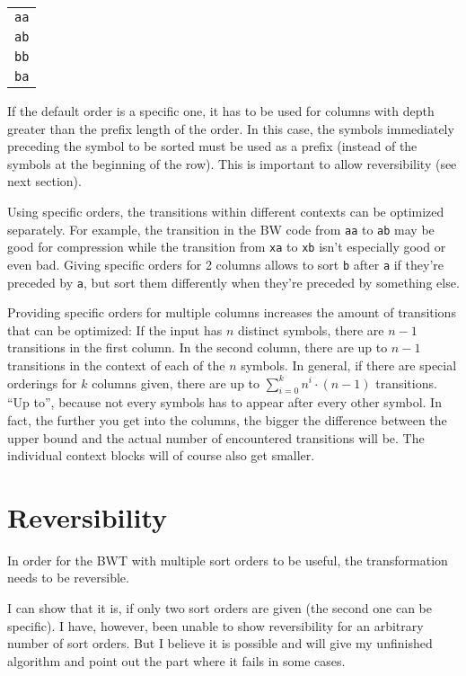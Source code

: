 \documentclass[a4paper]{scrreprt}
\begin{document}
\begin{tabular}{c}
\texttt{aa} \\
\texttt{ab} \\
\texttt{bb} \\ 
\texttt{ba} \\
\end{tabular}

If the default order is a specific one, it has to be used for columns with depth
greater than the prefix length of the order. In this case, the symbols
immediately preceding the symbol to be sorted must be used as a prefix (instead
of the symbols at the beginning of the row). This is important to allow
reversibility (see next section).

Using specific orders, the transitions within different contexts can be
optimized separately. For example, the transition in the BW code from
\texttt{aa} to \texttt{ab} may be good for compression while the transition
from \texttt{xa} to \texttt{xb} isn't especially good or even bad. Giving
specific orders for 2 columns allows to sort \texttt{b} after \texttt{a} if
they're preceded by \texttt{a}, but sort them differently when they're preceded
by something else.

Providing specific orders for multiple columns increases the amount of
transitions that can be optimized: If the input has \(n\) distinct symbols,
there are \(n - 1\) transitions in the first column. In the second column, there
are up to \(n - 1\) transitions in the context of each of the \(n\) symbols. In
general, if there are special orderings for \(k\) columns given, there are up to
\(\sum_{i=0}^{k} n^{i} \cdot (n - 1)\) transitions. ``Up to'', because not every
symbols has to appear after every other symbol. In fact, the further you get
into the columns, the bigger the difference between the upper bound and the
actual number of encountered transitions will be. The individual context blocks
will of course also get smaller.


\section{Reversibility}

In order for the BWT with multiple sort orders to be useful, the transformation
needs to be reversible.

I can show that it is, if only two sort orders are given (the second one can be
specific). I have, however, been unable to show reversibility for an arbitrary
number of sort orders. But I believe it is possible and will give my unfinished
algorithm and point out the part where it fails in some cases.
\end{document}
